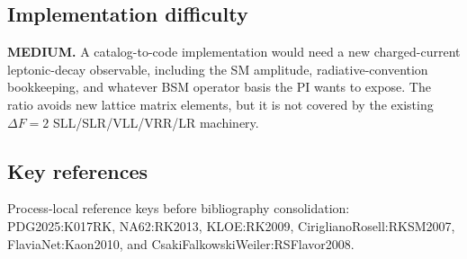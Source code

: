 \subsection*{Implementation difficulty}
\textbf{MEDIUM.}  A catalog-to-code implementation would need a new
charged-current leptonic-decay observable, including the SM amplitude,
radiative-convention bookkeeping, and whatever BSM operator basis the PI wants
to expose.  The ratio avoids new lattice matrix elements, but it is not covered
by the existing \(\Delta F=2\) SLL/SLR/VLL/VRR/LR machinery.

\subsection*{Key references}
Process-local reference keys before bibliography consolidation:
PDG2025:K017RK, NA62:RK2013, KLOE:RK2009, CiriglianoRosell:RKSM2007,
FlaviaNet:Kaon2010, and CsakiFalkowskiWeiler:RSFlavor2008.
